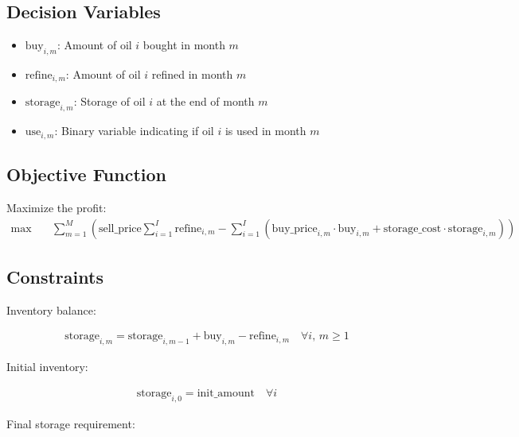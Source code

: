 \documentclass{article}
\begin{document}
\subsection*{Decision Variables}
\begin{itemize}
    \item $\text{buy}_{i,m}$: Amount of oil $i$ bought in month $m$
    \item $\text{refine}_{i,m}$: Amount of oil $i$ refined in month $m$
    \item $\text{storage}_{i,m}$: Storage of oil $i$ at the end of month $m$
    \item $\text{use}_{i,m}$: Binary variable indicating if oil $i$ is used in month $m$
\end{itemize}

\subsection*{Objective Function}
Maximize the profit:
\begin{equation}
\begin{aligned}
    \max \quad & \sum_{m=1}^{M} \left(\text{sell\_price} \sum_{i=1}^{I} \text{refine}_{i,m} - \sum_{i=1}^{I} \left( \text{buy\_price}_{i,m} \cdot \text{buy}_{i,m} + \text{storage\_cost} \cdot \text{storage}_{i,m} \right) \right)
\end{aligned}
\end{equation}

\subsection*{Constraints}

\noindent Inventory balance:

\begin{equation}
\begin{aligned}
    \text{storage}_{i,m} = \text{storage}_{i,m-1} + \text{buy}_{i,m} - \text{refine}_{i,m} \quad \forall i, \, m \geq 1
\end{aligned}
\end{equation}

\noindent Initial inventory:

\begin{equation}
\begin{aligned}
    \text{storage}_{i,0} = \text{init\_amount} \quad \forall i
\end{aligned}
\end{equation}

\noindent Final storage requirement:
\end{document}
